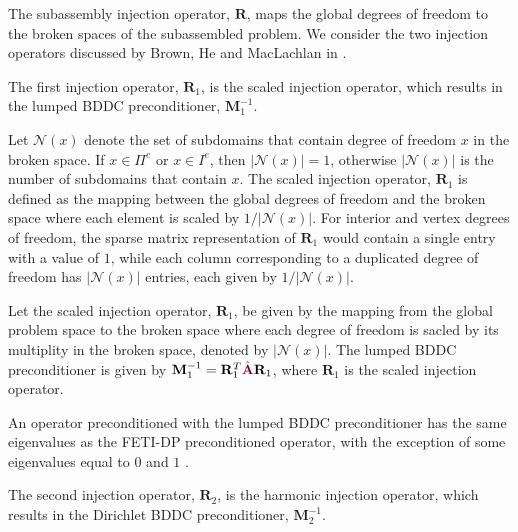 The subassembly injection operator, $\mathbf{R}$, maps the global degrees of freedom to the broken spaces of the subassembled problem.
We consider the two injection operators discussed by Brown, He and MacLachlan in \cite{brown2019local}.

The first injection operator, $\mathbf{R}_1$, is the scaled injection operator, which results in the lumped BDDC preconditioner, $\mathbf{M}^{-1}_1$.

Let $\mathcal{N} \left( x \right)$ denote the set of subdomains that contain degree of freedom $x$ in the broken space.
If $x \in \Pi^e$ or $x \in I^e$, then $\lvert \mathcal{N} \left( x \right) \rvert = 1$, otherwise $\lvert \mathcal{N} \left( x \right) \rvert$ is the number of subdomains that contain $x$.
The scaled injection operator, $\mathbf{R}_1$ is defined as the mapping between the global degrees of freedom and the broken space where each element is scaled by $1 / \lvert \mathcal{N} \left( x \right) \rvert$.
For interior and vertex degrees of freedom, the sparse matrix representation of $\mathbf{R}_1$ would contain a single entry with a value of $1$, while each column corresponding to a duplicated degree of freedom has $\lvert \mathcal{N} \left( x \right) \rvert$ entries, each given by $1 / \lvert \mathcal{N} \left( x \right) \rvert$.

\begin{definition}
Let the scaled injection operator, $\mathbf{R}_1$, be given by the mapping from the global problem space to the broken space where each degree of freedom is sacled by its multiplity in the broken space, denoted by $\lvert \mathcal{N} \left( x \right) \rvert$.
The lumped BDDC preconditioner is given by $\mathbf{M}^{-1}_1 = \mathbf{R}_1^T \hat{\color{burgundy}\mathbf{A}} \mathbf{R}_1$, where $\mathbf{R}_1$ is the scaled injection operator.
\label{def:lumpedbddc}
\end{definition}

An operator preconditioned with the lumped BDDC preconditioner has the same eigenvalues as the FETI-DP preconditioned operator, with the exception of some eigenvalues equal to $0$ and $1$ \cite{li2007use}.

The second injection operator, $\mathbf{R}_2$, is the harmonic injection operator, which results in the Dirichlet BDDC preconditioner, $\mathbf{M}^{-1}_2$.

